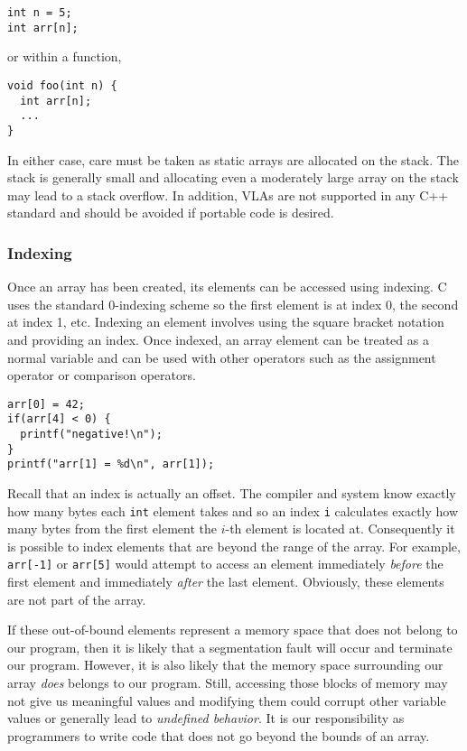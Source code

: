 \begin{verbatim}
int n = 5;
int arr[n];
\end{verbatim}

or within a function, 

\begin{verbatim}
void foo(int n) {
  int arr[n];
  ...
}
\end{verbatim}

In either case, care must be taken as static arrays are allocated
on the stack.  The stack is generally small and allocating even a
moderately large array on the stack may lead to a stack overflow.
In addition, VLAs are not supported in any C++ standard and
should be avoided if portable code is desired.


\subsubsection{Indexing}

Once an array has been created, its elements can be accessed
using indexing.  C uses the standard 0-indexing scheme so the
first element is at index 0, the second at index 1, etc.  Indexing
an element involves using the square bracket notation and
providing an index.  Once indexed, an array element can be
treated as a normal variable and can be used with other operators
such as the assignment operator or comparison operators.

\begin{verbatim}
arr[0] = 42;
if(arr[4] < 0) {
  printf("negative!\n");
}
printf("arr[1] = %d\n", arr[1]);
\end{verbatim}

Recall that an index is actually an offset.  The compiler and
system know exactly how many bytes each \texttt{int}
element takes and so an index \texttt{i} calculates
exactly how many bytes from the first element the $i$-th
element is located at.  Consequently it is possible to index
elements that are beyond the range of the array.  For example, 
\texttt{arr[-1]} or \texttt{arr[5]} would attempt
to access an element immediately \emph{before} the first element
and immediately \emph{after} the last element.  Obviously, 
these elements are not part of the array.  

If these out-of-bound elements represent a memory space
that does not belong to our program, then it is likely that
a \gls{segmentation fault} will occur and terminate our program.
However, it is also likely that the memory 
space surrounding our array \emph{does} belongs to our program.  Still,
accessing those blocks of memory may not give us meaningful
values and modifying them could corrupt other variable values
or generally lead to \emph{undefined behavior}.  It is our
responsibility as programmers to write code that does not
go beyond the bounds of an array.

